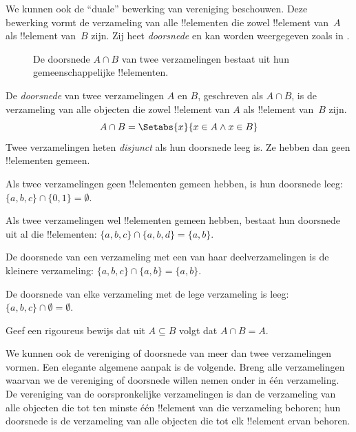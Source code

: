 \documentclass[../../../include/open-logic-section]{subfiles}
\begin{document}
\begin{explain}
We kunnen ook de ``duale'' bewerking van vereniging beschouwen. Deze bewerking
vormt de verzameling van alle !!{element}en die zowel !!{element} van~$A$
als !!{element} van~$B$ zijn. Zij heet \emph{doorsnede} en kan worden
weergegeven zoals in .
\begin{figure}
  \caption{De doorsnede $A \cap B$ van twee verzamelingen bestaat uit hun
    gemeenschappelijke !!{element}en.}
\end{figure}
\end{explain}

\begin{defn}[Doorsnede]
De \emph{doorsnede} van twee verzamelingen $A$ en $B$, geschreven als
$A \cap B$, is de verzameling van alle objecten die zowel !!{element} van
$A$ als !!{element} van~$B$ zijn.
\[
A \cap B = \Setabs{x}{x \in A \land x \in B}
\]
Twee verzamelingen heten \emph{disjunct} als hun doorsnede leeg is. Ze hebben
dan geen !!{element}en gemeen.
\end{defn}

\begin{ex}
Als twee verzamelingen geen !!{element}en gemeen hebben, is hun doorsnede leeg:
$\{ a, b, c\} \cap \{ 0, 1\} = \emptyset$.

Als twee verzamelingen wel !!{element}en gemeen hebben, bestaat hun doorsnede
uit al die !!{element}en: $\{a, b, c \} \cap \{a, b, d \} = \{a, b\}$.

De doorsnede van een verzameling met een van haar deelverzamelingen is de
kleinere verzameling: $\{a, b, c\} \cap \{a, b\} = \{a, b\}$.

De doorsnede van elke verzameling met de lege verzameling is leeg: $\{a, b, c \}
\cap \emptyset = \emptyset$.
\end{ex}

\begin{prob}
Geef een rigoureus bewijs dat uit $A \subseteq B$ volgt dat $A \cap B = A$.
\end{prob}

\begin{explain}
We kunnen ook de vereniging of doorsnede van meer dan twee verzamelingen
vormen. Een elegante algemene aanpak is de volgende. Breng alle verzamelingen
waarvan we de vereniging of doorsnede willen nemen onder in één verzameling.
De vereniging van de oorspronkelijke verzamelingen is dan de verzameling van
alle objecten die tot ten minste één !!{element} van die verzameling behoren;
hun doorsnede is de verzameling van alle objecten die tot elk !!{element}
ervan behoren.
\end{explain}
\end{document}
